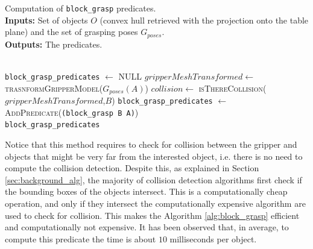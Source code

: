 \begin{algorithm}
\caption{Computation of \texttt{block\_grasp} predicates. \\
\textbf{Inputs:} Set of objects $O$ (convex hull retrieved with the projection onto the table plane) and  the set of grasping poses $G_{poses}$.\\
\textbf{Outputs:} The  predicates.
}\label{alg:block_grasp}
\begin{algorithmic}
\\
  \texttt{block\_grasp\_predicates} $\gets$ \textsc{NULL}
  \State $gripperMeshTransformed \gets$ \textsc{trasnformGripperModel}($G_{poses}(A)$)
	\State $collision \gets$ \textsc{isThereCollision($gripperMeshTransformed$,$B$)}
		\State \texttt{block\_grasp\_predicates} $\gets$ \textsc{AddPredicate}(\texttt{(block\_grasp B A)})
	\EndIf
  \EndIf
\EndFor
\EndFor \\
\Return  \texttt{block\_grasp\_predicates}
\EndFunction
\end{algorithmic}
\end{algorithm}   
 

Notice that this method requires to check for collision between the gripper and objects that might be very far from the interested object, i.e. there is no need to compute the collision detection.  Despite this, as explained in Section \ref{sec:background_alg}, the majority of collision detection algorithms first check if the bounding boxes of the objects intersect. This is a computationally cheap operation, and only if they intersect the computationally expensive algorithm are used to check for collision. This makes the Algorithm \ref{alg:block_grasp} efficient and computationally not expensive. It has been observed that, in average, to compute this predicate the time is about $10$ milliseconds per object. 
 
